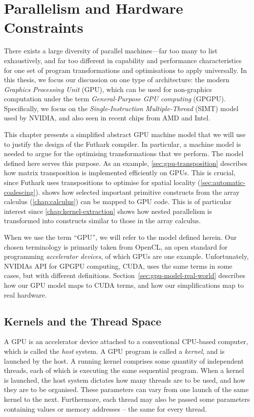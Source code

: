\chapter{Parallelism and Hardware Constraints}
\label{chap:hardware}

There exists a large diversity of parallel machines---far too many to
list exhaustively, and far too different in capability and performance
characteristics for one set of program transformations and
optimisations to apply universally.  In this thesis, we focus our
discussion on one type of architecture: the modern \textit{Graphics
  Processing Unit} (GPU), which can be used for non-graphics
computation under the term \textit{General-Purpose GPU computing}
(GPGPU).  Specifically, we focus on the \textit{Single-Instruction
  Multiple-Thread} (SIMT) model used by NVIDIA, and also seen in
recent chips from AMD and Intel.

This chapter presents a simplified abstract GPU machine model that we
will use to justify the design of the Futhark compiler.  In
particular, a machine model is needed to argue for the optimising
transformations that we perform.  The model defined here serves this
purpose.  As an example, \cref{sec:gpu-transposition} describes how
matrix transposition is implemented efficiently on GPUs.  This is
crucial, since Futhark uses transpositions to optimise for spatial
locality (\cref{sec:automatic-coalescing}).
 shows how selected important
primitive constructs from the array calculus (\cref{chap:calculus})
can be mapped to GPU code.  This is of particular interest since
\cref{chap:kernel-extraction} shows how nested parallelism is
transformed into constructs similar to those in the array calculus.

When we use the term ``GPU'', we will refer to the model defined
herein.  Our chosen terminology is primarily taken from OpenCL, an
open standard for programming \textit{accelerator devices}, of which
GPUs are one example.  Unfortunately, NVIDIAs API for GPGPU computing,
CUDA, uses the same terms in some cases, but with different
definitions.  Section~\ref{sec:gpu-model-real-world} describes how our
GPU model maps to CUDA terms, and how our simplifications map to real
hardware.
\section{Kernels and the Thread Space}
\label{sec:kernel-thread-space}

A GPU is an accelerator device attached to a conventional CPU-based
computer, which is called the \textit{host} system.  A GPU program is
called a \textit{kernel}, and is launched by the host.  A running
kernel comprises some quantity of independent threads, each of which
is executing the same sequential program.  When a kernel is launched,
the host system dictates how many threads are to be used, and how they
are to be organised.  These parameters can vary from one launch of the
same kernel to the next.  Furthermore, each thread may also be passed
some parameters containing values or memory addresses -- the same for
every thread.

